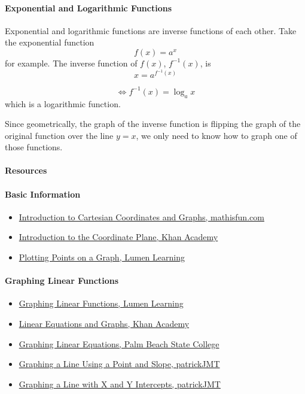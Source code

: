 \paragraph{Exponential and Logarithmic Functions}

Exponential and logarithmic functions are inverse functions of each other. Take the exponential function 
$$
f(x) = a^x
$$
for example. The inverse function of $f(x)$, $f^{-1}(x)$, is
$$
x = a^{f^{-1}(x)}
$$

$$
\Leftrightarrow f^{-1}(x) = \log_a x
$$
which is a logarithmic function.

Since geometrically, the graph of the inverse function is flipping the graph of the original function over the line $y = x$, we only need to know how to graph one of those functions.

\paragraph{Resources}

\paragraph{Basic Information}

\begin{itemize}
    \item \href{https://www.mathsisfun.com/data/cartesian-coordinates.html}{Introduction to Cartesian Coordinates and Graphs, mathisfun.com}
    \item \href{https://www.khanacademy.org/math/algebra/x2f8bb11595b61c86:foundation-algebra/x2f8bb11595b61c86:algebra-overview-history/v/descartes-and-cartesian-coordinates}{Introduction to the Coordinate Plane, Khan Academy}
    \item \href{https://courses.lumenlearning.com/ivytech-collegealgebra/chapter/plotting-ordered-pairs-in-the-cartesian-coordinate-system/}{Plotting Points on a Graph, Lumen Learning}
\end{itemize}

\paragraph{Graphing Linear Functions}

\begin{itemize}
    \item \href{https://courses.lumenlearning.com/waymakercollegealgebra/chapter/graph-linear-functions/}{Graphing Linear Functions, Lumen Learning}
    \item \href{https://www.khanacademy.org/math/algebra/x2f8bb11595b61c86:linear-equations-graphs}{Linear Equations and Graphs, Khan Academy}
    \item \href{https://www.palmbeachstate.edu/prepmathlw/Documents/graphing\%20linear\%20equations.pdf}{Graphing Linear Equations, Palm Beach State College}
    \item \href{https://www.youtube.com/watch?v=lkRyxnqOb8M}{Graphing a Line Using a Point and Slope, patrickJMT}
    \item \href{https://www.youtube.com/watch?v=mxBoni8N70Y}{Graphing a Line with X and Y Intercepts, patrickJMT}
\end{itemize}

